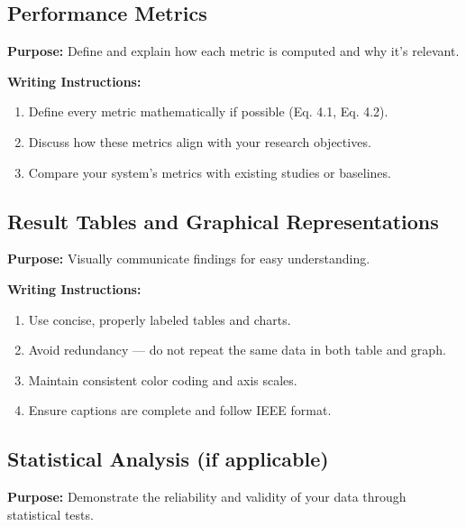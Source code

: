 \subsection{Performance Metrics}

{\color{blue}\textbf{Purpose:}
Define and explain how each metric is computed and why it’s relevant.} \\

{\color{red}\textbf{Writing Instructions:}
\begin{enumerate}
    \item Define every metric mathematically if possible (Eq. 4.1, Eq. 4.2).
    
    \item Discuss how these metrics align with your research objectives.
    
    \item Compare your system’s metrics with existing studies or baselines.
\end{enumerate}}

\subsection{Result Tables and Graphical Representations}

{\color{blue}\textbf{Purpose:}
Visually communicate findings for easy understanding.} \\

{\color{red}\textbf{Writing Instructions:}
\begin{enumerate}
    \item Use concise, properly labeled tables and charts.
    
    \item Avoid redundancy — do not repeat the same data in both table and graph.
    
    \item Maintain consistent color coding and axis scales.
    
    \item Ensure captions are complete and follow IEEE format.
\end{enumerate}}


\subsection{Statistical Analysis (if applicable)}

{\color{blue}\textbf{Purpose:}
Demonstrate the reliability and validity of your data through statistical tests.} \\

